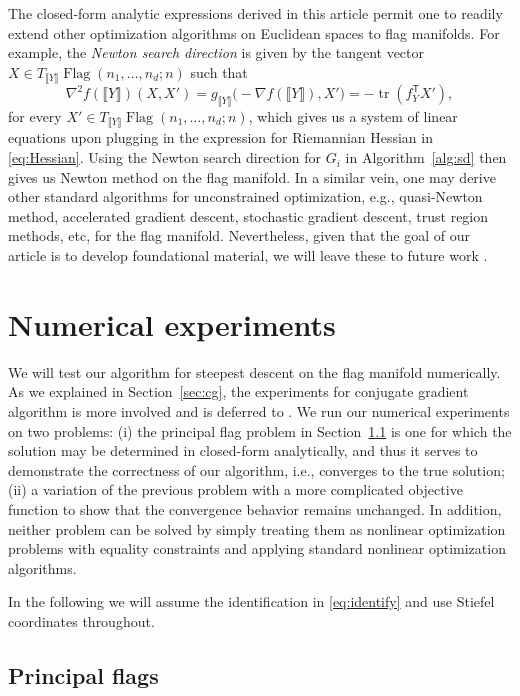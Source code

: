 \documentclass[11pt,reqno]{amsart}%
\theoremstyle{definition}
\theoremstyle{remark}
\newcommand{\tp}{{\scriptscriptstyle\mathsf{T}}}
\newcommand{\lb}{\llbracket}
\newcommand{\rb}{\rrbracket}
\DeclareMathOperator{\Flag}{Flag}
\DeclareMathOperator{\tr}{tr}
\begin{document}
The closed-form analytic expressions derived in this article permit one to readily extend other optimization algorithms on Euclidean spaces to flag manifolds. For example, the \emph{Newton search direction} is given by the  tangent vector $X \in T_{\lb Y \rb} \Flag(n_1,\dots,n_d;n)$ such that 
\[
\nabla^2f(\lb Y \rb) (X,X') = g_{\lb Y \rb}\bigl(-\nabla f(\lb Y \rb),X' \bigr) = -\tr (f_Y^\tp  X'),
\]
for every $X'\in T_{\lb Y \rb} \Flag(n_1,\dots,n_d;n)$, which gives us a system of linear equations upon plugging in the expression for Riemannian Hessian in \eqref{eq:Hessian}. Using the Newton search direction for $G_i$ in Algorithm~\ref{alg:sd} then gives us Newton method on the flag manifold. In a similar vein,  one may derive other standard algorithms for unconstrained optimization, e.g., quasi-Newton method, accelerated gradient descent, stochastic gradient descent, trust region methods, etc, for the flag manifold. Nevertheless, given that the goal of our article is to develop foundational material, we will leave these  to  future work \cite{next}.

\section{Numerical experiments}\label{sec:num}

We will test our algorithm for steepest descent on the flag manifold numerically. As we explained in Section~\ref{sec:cg}, the experiments for conjugate gradient algorithm is more involved and is deferred to \cite{next}. We run our numerical experiments on two problems: (i) the  principal flag problem in Section~\ref{sec:dis} is one for which the solution may be determined in closed-form analytically, and thus it serves to  demonstrate the correctness of our algorithm, i.e., converges to the true solution; (ii) a variation of the previous problem with a more complicated objective function to show that the convergence behavior remains unchanged. In addition, neither problem can be solved by simply treating them as nonlinear optimization problems with equality constraints and applying standard nonlinear optimization algorithms.

In the following we will assume the identification in \eqref{eq:identify} and  use Stiefel coordinates throughout.

\subsection{Principal flags}\label{sec:dis}
\end{document}

